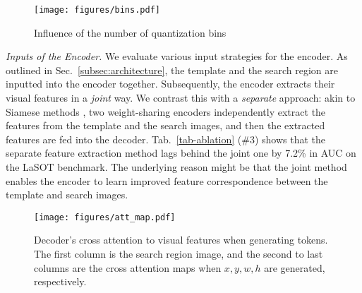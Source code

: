 \begin{figure}[t!]
\begin{center}
\texttt{[image: figures/bins.pdf]}
\end{center}
    \vspace{-6mm}
   \caption{Influence of the number of quantization bins}
\label{fig:bins}
\end{figure}

\textit{Inputs of the Encoder.}
We evaluate various input strategies for the encoder. As outlined in Sec.~\ref{subsec:architecture}, the template and the search region are inputted into the encoder together. 
Subsequently, the encoder extracts their visual features in a \emph{joint} way. We contrast this with a \emph{separate} approach: akin to Siamese methods \cite{SiameseFC,SiameseRPN}, two weight-sharing encoders independently extract the features from the template and the search images, and then the extracted features are fed into the decoder. 
Tab.~\ref{tab-ablation} (\#3) shows that the separate feature extraction method lags behind the joint one by 7.2\% in AUC on the LaSOT benchmark. 
The underlying reason might be that the joint method enables the encoder to learn improved feature correspondence between the template and search images.

\begin{figure}[t!]
\begin{center}
\texttt{[image: figures/att\_map.pdf]}
\end{center}
    \vspace{-4mm}
   \caption{Decoder's cross attention to visual features when generating tokens. The first column is the search region image, and the second to last columns are the cross attention maps when $x,y,w,h$ are generated, respectively.}
\label{fig:attmap}
    \vspace{-3mm}
\end{figure}

\begin{table}[t]\normalsize
\centering
  \caption{Ablation study of the template size. The baseline setting is marked in \colorbox{gray!15}{gray}.}
  \label{tab-ablation_template}
      \vspace{-3mm}
  \vspace{-3mm}
\end{table}

